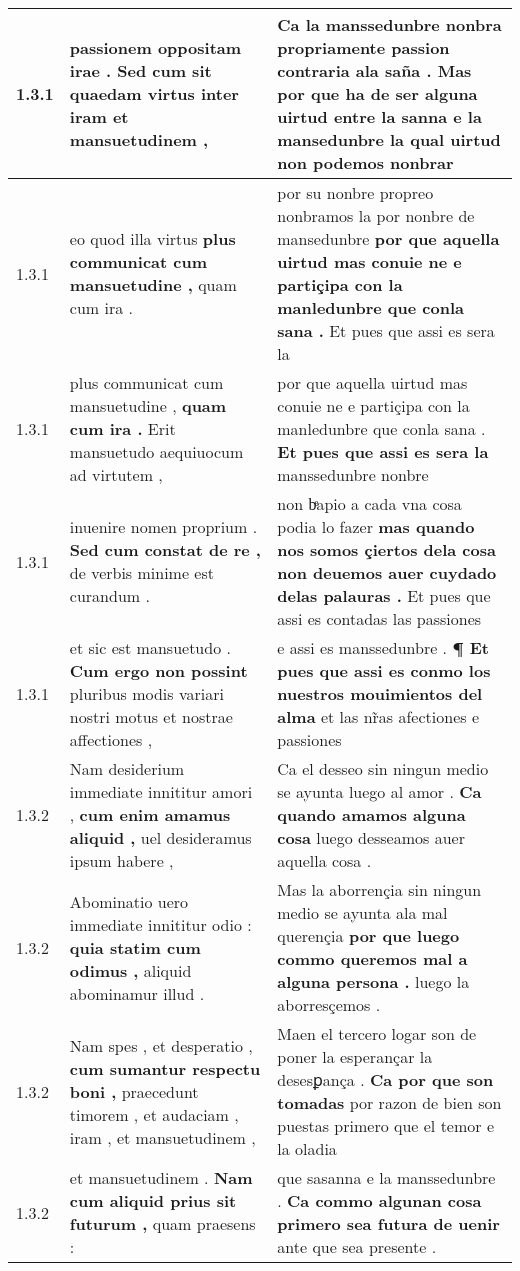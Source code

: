 \begin{tabular}{|p{1cm}|p{6.5cm}|p{6.5cm}|}
1.3.1 & passionem oppositam irae . \textbf{ Sed cum sit quaedam virtus } inter iram et mansuetudinem , & Ca la manssedunbre nonbra propriamente passion contraria ala saña . \textbf{ Mas por que ha de ser alguna uirtud entre la sanna e la mansedunbre } la qual uirtud non podemos nonbrar \\\hline
1.3.1 & eo quod illa virtus \textbf{ plus communicat cum mansuetudine , } quam cum ira . & por su nonbre propreo nonbramos la por nonbre de mansedunbre \textbf{ por que aquella uirtud mas conuie ne e partiçipa con la manledunbre que conla sana . } Et pues que assi es sera la \\\hline
1.3.1 & plus communicat cum mansuetudine , \textbf{ quam cum ira . } Erit mansuetudo aequiuocum ad virtutem , & por que aquella uirtud mas conuie ne e partiçipa con la manledunbre que conla sana . \textbf{ Et pues que assi es sera la } manssedunbre nonbre \\\hline
1.3.1 & inuenire nomen proprium . \textbf{ Sed cum constat de re , } de verbis minime est curandum . & non bͤapio a cada vna cosa podia lo fazer \textbf{ mas quando nos somos çiertos dela cosa non deuemos auer cuydado delas palauras . } Et pues que assi es contadas las passiones \\\hline
1.3.1 & et sic est mansuetudo . \textbf{ Cum ergo non possint } pluribus modis variari nostri motus et nostrae affectiones , & e assi es manssedunbre . \textbf{ ¶ Et pues que assi es conmo los nuestros mouimientos del alma } et las nr̃as afectiones e passiones \\\hline
1.3.2 & Nam desiderium immediate innititur amori , \textbf{ cum enim amamus aliquid , } uel desideramus ipsum habere , & Ca el desseo sin ningun medio se ayunta luego al amor . \textbf{ Ca quando amamos alguna cosa } luego desseamos auer aquella cosa . \\\hline
1.3.2 & Abominatio uero immediate innititur odio : \textbf{ quia statim cum odimus , } aliquid abominamur illud . & Mas la aborrençia sin ningun medio se ayunta ala mal querençia \textbf{ por que luego commo queremos mal a alguna persona . } luego la aborresçemos . \\\hline
1.3.2 & Nam spes , et desperatio , \textbf{ cum sumantur respectu boni , } praecedunt timorem , et audaciam , iram , et mansuetudinem , & Maen el tercero logar son de poner la esperançar la desesꝑança . \textbf{ Ca por que son tomadas } por razon de bien son puestas primero que el temor e la oladia \\\hline
1.3.2 & et mansuetudinem . \textbf{ Nam cum aliquid prius sit futurum , } quam praesens : & que sasanna e la manssedunbre . \textbf{ Ca commo algunan cosa primero sea futura de uenir } ante que sea presente . \\\hline

\end{tabular}

